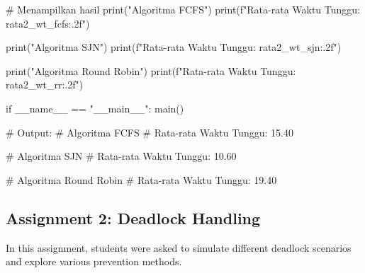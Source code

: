 \documentclass[12pt]{article}
\begin{document}
\begin{itemize}
\begin{python}
    # Menampilkan hasil
    print("Algoritma FCFS")
    print(f"Rata-rata Waktu Tunggu: {rata2_wt_fcfs:.2f}\n")

    print("Algoritma SJN")
    print(f"Rata-rata Waktu Tunggu: {rata2_wt_sjn:.2f}\n")

    print("Algoritma Round Robin")
    print(f"Rata-rata Waktu Tunggu: {rata2_wt_rr:.2f}\n")

if __name__ == "__main__":
    main()

# Output:
# Algoritma FCFS
# Rata-rata Waktu Tunggu: 15.40

# Algoritma SJN
# Rata-rata Waktu Tunggu: 10.60

# Algoritma Round Robin
# Rata-rata Waktu Tunggu: 19.40
    \end{python}
\end{itemize}

\subsection{Assignment 2: Deadlock Handling}
In this assignment, students were asked to simulate different deadlock scenarios and explore various prevention methods.
\subsubsection{}
\subsubsection{}
\subsubsection{}
\subsubsection{}
\subsubsection{}
\subsubsection{}
\subsubsection{}
\subsubsection{}
\end{document}
